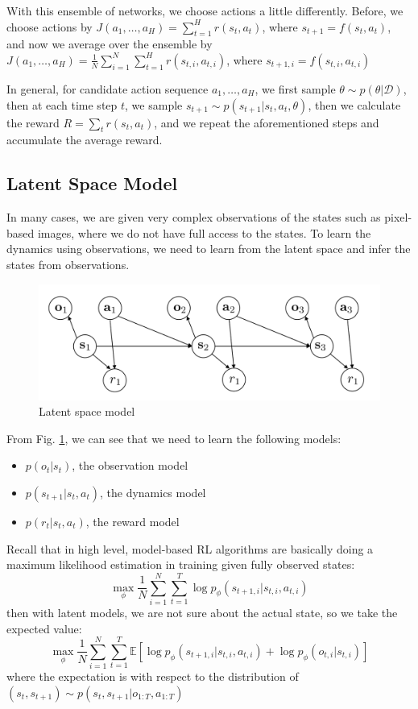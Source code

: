 With this ensemble of networks, we choose actions a little differently. Before, we choose actions by $J(a_1,\dots,a_H) = \sum_{t=1}^Hr(s_t,a_t)$, where $s_{t+1} = f(s_t,a_t)$, and now we average over the ensemble by $J(a_1,\dots,a_H) = \frac{1}{N}\sum_{i=1}^N\sum_{t=1}^Hr(s_{t,i},a_{t,i})$, where $s_{t+1,i} = f(s_{t,i},a_{t,i})$

In general, for candidate action sequence $a_1,\dots,a_H$, we first sample $\theta \sim p(\theta|\mathcal{D})$, then at each time step $t$, we sample $s_{t+1}\sim p(s_{t+1}|s_t,a_t,\theta)$, then we calculate the reward $R = \sum_t r(s_t,a_t)$, and we repeat the aforementioned steps and accumulate the average reward.
\subsection{Latent Space Model}
In many cases, we are given very complex observations of the states such as pixel-based images, where we do not have full access to the states. To learn the dynamics using observations, we need to learn from the latent space and infer the states from observations. 
\begin{figure}
    \centering
    \includegraphics[scale=0.4]{figures/latent.png}
    \caption{Latent space model}
    \label{fig:latent}
\end{figure}
From Fig. \ref{fig:latent}, we can see that we need to learn the following models:
\begin{itemize}
    \item $p(o_t|s_t)$, the observation model
    \item $p(s_{t+1}|s_t,a_t)$, the dynamics model
    \item $p(r_t|s_t,a_t)$, the reward model
\end{itemize}

Recall that in high level, model-based RL algorithms are basically doing a maximum likelihood estimation in training given fully observed states:
\[
\max_\phi \frac{1}{N}\sum_{i=1}^N\sum_{t=1}^T\log p_\phi(s_{t+1,i}|s_{t,i},a_{t,i})
\]
then with latent models, we are not sure about the actual state, so we take the expected value:
\[
\max_\phi \frac{1}{N}\sum_{i=1}^N\sum_{t=1}^T\mathbb{E}\left[\log p_\phi(s_{t+1,i}|s_{t,i},a_{t,i}) + \log p_\phi(o_{t,i}|s_{t,i})\right]
\]
where the expectation is with respect to the distribution of $(s_t,s_{t+1})\sim p(s_t,s_{t+1}|o_{1:T},a_{1:T})$

